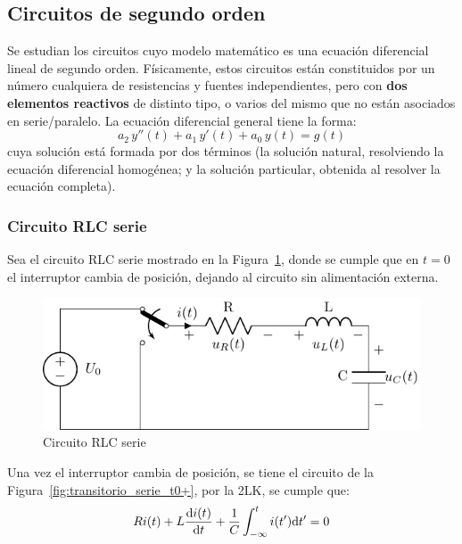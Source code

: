 \subsection{Circuitos de segundo orden}
Se estudian los circuitos cuyo modelo matemático es una ecuación
diferencial lineal de segundo orden. Físicamente, estos circuitos
están constituidos por un número cualquiera de resistencias y fuentes
independientes, pero con \textbf{dos elementos reactivos} de distinto
tipo, o varios del mismo que no están asociados en serie/paralelo. La
ecuación diferencial general tiene la forma:
\begin{equation*}
  a_2\,y''(t)+a_1\,y'(t)+a_0\,y(t)=g(t)
\end{equation*}
cuya solución está formada por dos términos (la solución natural,
resolviendo la ecuación diferencial homogénea; y la solución
particular, obtenida al resolver la ecuación completa).
	
\subsubsection{Circuito RLC serie}

Sea el circuito RLC serie mostrado en la
Figura~\ref{fig:transitorio_circuito_RLC_serie}, donde se cumple que
en $t = 0$ el interruptor cambia de posición, dejando al circuito sin
alimentación externa.
\begin{figure}[H]
  \centering
  \includegraphics{../figs/transitorio_circuitoRLC_serie.pdf}
  \caption{Circuito RLC serie}
  \label{fig:transitorio_circuito_RLC_serie}
\end{figure}

Una vez el interruptor cambia de posición, se tiene el circuito de la
Figura~\ref{fig:transitorio_serie_t0+}, por la 2LK, se cumple que:
\[
  Ri(t) + L\diff{i(t)}{t} + \frac{1}{C}\int_{-\infty}^t i(t')
  \mathrm{d}t' = 0
\]

